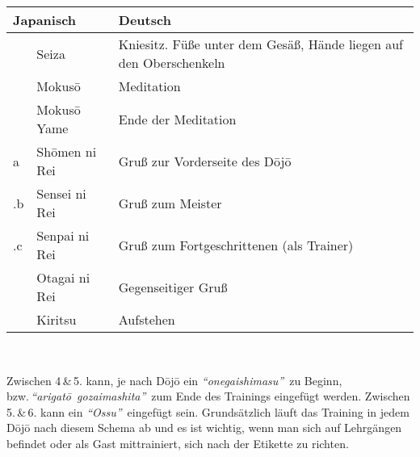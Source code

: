 \setcounter{num}{0}
\setcounter{numz}{0}
\begin{tcolorbox}[width=\textwidth,height=\textheight,right=12pt,left=12pt,colframe=lightgray,colback=white,fonttitle=\bfseries,coltitle=black,title=Allgemeines:\indent Trainingsablauf Begrüßung und Ende]
	\null\vfill\null	
	\begin{tabularx}{\textwidth}{llX}
		\multicolumn{2}{l}{\textbf{Japanisch}} 	& \textbf{Deutsch}\\
		\midrule
		\ctu		& Seiza 				& Kniesitz. Füße unter dem Gesäß, Hände liegen auf den Oberschenkeln\\
		\ctu		& Mokus\={o}			& Meditation\\
		\ctu		& Mokus\={o} Yame		& Ende der Meditation\\
		\ctu a		& Sh\={o}men ni Rei		& Gruß zur Vorderseite des D\={o}j\={o}\\
		\thenum .b	& Sensei ni Rei			& Gruß zum Meister\\
		\thenum .c	& Senpai ni Rei			& Gruß zum Fortgeschrittenen (als Trainer)\\
		\ctu		& Otagai ni Rei			& Gegenseitiger Gruß\\
		\ctu		& Kiritsu				& Aufstehen\\		
		\midrule
	\end{tabularx}\\\null\vfill\null
	\begin{center}
		\parbox{\textwidth-2\tabcolsep}{Zwischen 4\,\&\,5. kann, je nach D\={o}j\={o} ein \textit{\textquotedblleft onegaishimasu\textquotedblright}~zu Beginn, bzw.\,\textit{\mbox{\textquotedblleft arigat\={o} gozaimashita\textquotedblright}}~zum Ende des Trainings eingefügt werden. Zwischen 5.\,\&\,6. kann ein \textit{\textquotedblleft Ossu\textquotedblright}~eingefügt sein. Grundsätzlich läuft das Training in jedem D\={o}j\={o} nach diesem Schema ab und es ist wichtig, wenn man sich auf Lehrgängen befindet oder als Gast mittrainiert, sich nach der Etikette zu richten.}
	\end{center}\null\vfill\null
\end{tcolorbox}
\clearpage
\pagebreak
\setcounter{num}{10}
\setcounter{numz}{0}	
